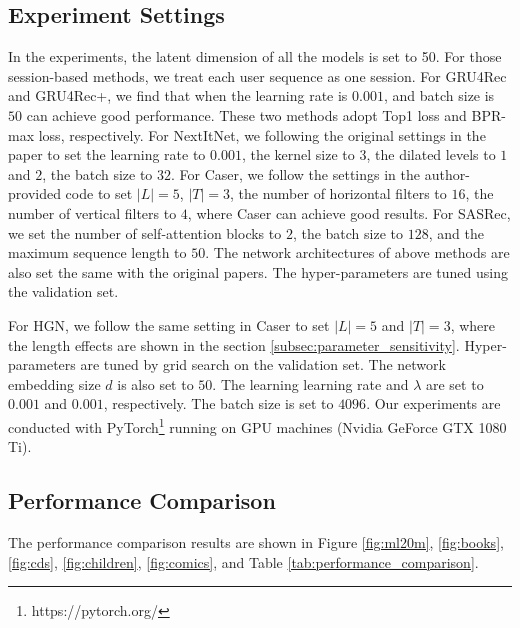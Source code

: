 \documentclass[sigconf]{acmart}
\begin{document}
\subsection{Experiment Settings}
In the experiments, the latent dimension of all the models is set to 50. For those session-based methods, we treat each user sequence as one session. For GRU4Rec and GRU4Rec+, we find that when the learning rate is $ 0.001 $, and batch size is $ 50 $ can achieve good performance. These two methods adopt Top1 loss and BPR-max loss, respectively. For NextItNet, we following the original settings in the paper to set the learning rate to $ 0.001 $, the kernel size to $ 3 $, the dilated levels to $ 1 $ and $ 2 $, the batch size to $ 32 $. For Caser, we follow the settings in the author-provided code to set $ |L|=5 $, $ |T|=3 $, the number of horizontal filters to $ 16 $, the number of vertical filters to $ 4 $, where Caser can achieve good results. For SASRec, we set the number of self-attention blocks to $ 2 $, the batch size to $ 128 $, and the maximum sequence length to $ 50 $. The network architectures of above methods are also set the same with the original papers. The hyper-parameters are tuned using the validation set.

For HGN, we follow the same setting in Caser to set $ |L|=5 $ and $ |T|=3 $, where the length effects are shown in the section \ref{subsec:parameter_sensitivity}. Hyper-parameters are tuned by grid search on the validation set. The network embedding size $ d $ is also set to $ 50 $. The learning learning rate and $ \lambda $ are set to $ 0.001 $ and $ 0.001 $, respectively. The batch size is set to $ 4096 $. Our experiments are conducted with PyTorch\footnote{https://pytorch.org/} running on GPU machines (Nvidia GeForce GTX 1080 Ti).

\subsection{Performance Comparison}
The performance comparison results are shown in Figure \ref{fig:ml20m}, \ref{fig:books}, \ref{fig:cds}, \ref{fig:children}, \ref{fig:comics}, and Table \ref{tab:performance_comparison}. 
\end{document}
